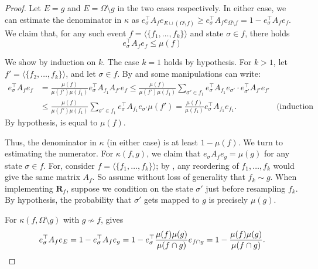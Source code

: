 \documentclass{toc}
\begin{document}
\begin{proof}
Let $E = g$ and $E = \Omega \setminus g$ in the two cases respectively.  In either case, we can estimate the denominator in $\kappa$ as $e_{\sigma}^{\top} A_f e_{E \cup (\Omega \setminus f)} \geq  e_{\sigma}^{\top} A_f e_{\Omega \setminus f} = 1 - e_{\sigma}^{\top} A_f e_f$. We claim that, for any such event $f = \langle \{f_1, \dots, f_k \} \rangle$ and state $\sigma \in f$, there holds
\begin{equation}
\label{yyw1}
e_{\sigma}^{\top} A_f e_f \leq \mu(f)
\end{equation}

We show  by induction on $k$. The case $k = 1$ holds by hypothesis.  For $k>1$, let $f' = \langle\{ f_2, \dots, f_k \} \rangle$, and let $\sigma \in f$. By  and some manipulations  can write:
\begin{align*}
e_{\sigma}^{\top} A_f e_f &=  \frac{\mu(f)}{\mu(f') \mu(f_1)} e_{\sigma}^{\top} A_{f_1} A_{f'}  e_{f}   \leq \frac{\mu(f)}{\mu(f') \mu(f_1)} \sum_{\sigma' \in f_1} e_{\sigma}^{\top} A_{f_1} e_{\sigma'} \cdot  e_{\sigma'}^{\top} A_{f'} e_{f'}  \\
& \leq \frac{\mu(f)}{\mu(f') \mu(f_1)} \sum_{\sigma' \in f_1} e_{\sigma}^{\top} A_{f_1} e_{\sigma'} \mu(f') =\frac{\mu(f)}{\mu(f_1)}   e_{\sigma}^{\top} A_{f_1}e_{f_1}.  & \text{(induction hypothesis)}
\end{align*}
By hypothesis, is equal to $\mu(f)$.

Thus, the denominator in $\kappa$ (in either case) is at least $1 - \mu(f)$. We turn to estimating the numerator. For $\kappa(f,g)$, we claim that $e_{\sigma} A_f e_g = \mu(g)$ for any state $\sigma \in f$. For, consider $f = \langle \{ f_1, \dots, f_k \} \rangle$; by , any reordering of $f_1, \dots, f_k$ would give the same matrix $A_f$.  So assume without loss of generality that $f_k \sim g$. When implementing $\mathbf R_f$, suppose we condition on the state $\sigma'$ just before resampling $f_k$. By hypothesis, the probability that $\sigma'$ gets mapped to $g$ is precisely $\mu(g)$. 


For $\kappa(f, \Omega \setminus g)$ with $g \not \sim f$,  gives \[
e_{\sigma}^{\top} A_f e_E = 1 - e_{\sigma}^{\top} A_f e_g = 1 - e_{\sigma}^{\top} \frac{\mu(f) \mu(g)}{\mu(f \cap g)} e_{f \cap g} = 1 -\frac{\mu(f) \mu(g)}{\mu(f \cap g)}. \qedhere \]
\end{proof}
\end{document}

